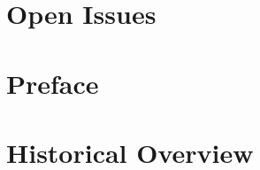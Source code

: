 \documentclass[cup9a]{cupbook}
\begin{document}
    \chapter{Open Issues} %
    


   \chapter{Preface}
     
   \chapter{Historical Overview}
   





\backmatter



\printindex
\end{document}
